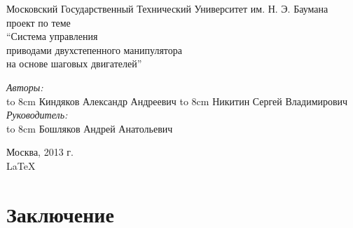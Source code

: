 \documentclass{article}
\begin{document}
\begin{titlepage}
\begin{center}
    {\large Московский Государственный Технический Университет им. Н. Э. Баумана}
    \\[50mm]
    { проект по теме}
    \\[7mm]
    {\LARGE ``Система управления \\ приводами двухстепенного манипулятора \\ на основе шаговых двигателей''}
    \\[37mm]

    \begin{flushright}
        \begin{minipage}{0.5\textwidth}
            \begin{flushleft}
                \textit{Авторы:} \\
                \hbox to 8cm {Киндяков Александр Андреевич \hfil \underline{\hspace{2cm} } }
                \vspace{2mm}
                \hbox to 8cm {Никитин Сергей Владимирович \hfil \underline{\hspace{2cm} } }
                \vspace{2cm}
                \textit{Руководитель:} \\
                \hbox to 8cm {Бошляков Андрей Анатольевич \hfil \underline{\hspace{2cm} } }
            \end{flushleft}
        \end{minipage}
    \end{flushright}

    \vfill %
    Москва, 2013 г. \\
    \LaTeX
\end{center}
\end{titlepage}

\tableofcontents
\newpage







\newpage

\section{Заключение}
\end{document}
